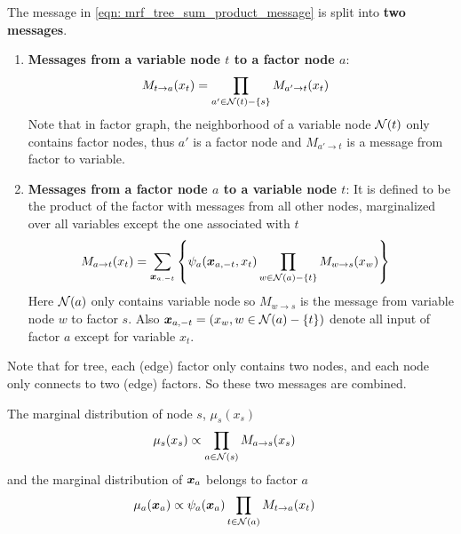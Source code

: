 \documentclass[11pt]{article}
\begin{document}
The message in \eqref{eqn: mrf_tree_sum_product_message} is split into \textbf{two messages}.
\begin{enumerate}
\item \textbf{Messages from a variable node $t$ to a factor node $a$}: 
\begin{align}
M_{t\rightarrow a}(x_t) &= \prod_{a' \in {\mathcal N}(t) - \left\{s\right\}}M_{a' \rightarrow t}(x_t) \label{eqn: message_var_to_factor}
\end{align} Note that in factor graph, the neighborhood of a variable node ${\mathcal N}(t)$ only contains factor nodes, thus $a'$ is a factor node and $M_{a' \rightarrow t}$ is a message from factor to variable.

\item \textbf{Messages from a factor node $a$ to a variable node $t$}: It is defined to be the product of the factor with messages from all other nodes, marginalized over all variables except the one associated with $t$
\begin{align}
M_{a \rightarrow t}(x_t) &= \sum_{\boldsymbol{x}_{a. -t}}\left\{\psi_{a}(\boldsymbol{x}_{a,-t}, x_t)\prod_{w \in {\mathcal N}(a) - \left\{t\right\}}M_{w \rightarrow s}(x_w)\right\}  \label{eqn: message_factor_to_product}
\end{align} Here ${\mathcal N}(a)$ only contains variable node so $M_{w \rightarrow s}$ is the message from variable node $w$ to factor $s$. Also $\boldsymbol{x}_{a, -t} = (x_{w}, w \in {\mathcal N}(a) - \left\{t\right\})$ denote all input of factor $a$ except for variable $x_t$.
\end{enumerate} Note that for tree, each (edge) factor only contains two nodes, and each node only connects to two (edge) factors. So these two messages are combined. 

The marginal distribution of node $s$, $\mu_s(x_s)$
\begin{align*}
\mu_s(x_s) &\propto \prod_{a \in {\mathcal N}(s)}M_{a \rightarrow s}(x_s)
\end{align*} and the marginal distribution of $\boldsymbol{x}_a$ belongs to factor $a$
\begin{align*}
\mu_a(\boldsymbol{x}_a) &\propto \psi_{a}(\boldsymbol{x}_{a})\prod_{t \in {\mathcal N}(a)}M_{t \rightarrow a}(x_t)
\end{align*}
\end{document}

